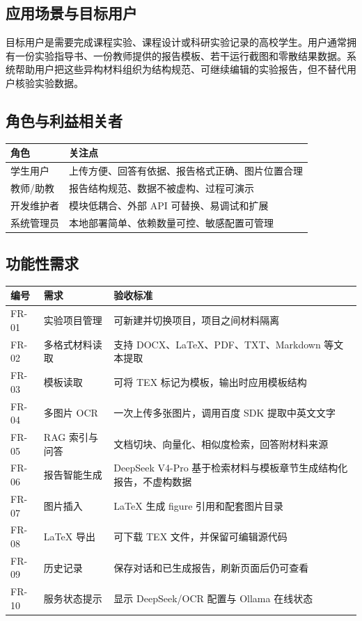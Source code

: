 \documentclass[12pt,a4paper]{ctexart}
\begin{document}
\subsection{应用场景与目标用户}
目标用户是需要完成课程实验、课程设计或科研实验记录的高校学生。用户通常拥有一份实验指导书、一份教师提供的报告模板、若干运行截图和零散结果数据。系统帮助用户把这些异构材料组织为结构规范、可继续编辑的实验报告，但不替代用户核验实验数据。

\subsection{角色与利益相关者}
\begin{table}[H]
\centering\small
\begin{tabularx}{\textwidth}{|X|X|}
\hline
\textbf{角色} & \textbf{关注点} \\ \hline
学生用户 & 上传方便、回答有依据、报告格式正确、图片位置合理 \\ \hline
教师/助教 & 报告结构规范、数据不被虚构、过程可演示 \\ \hline
开发维护者 & 模块低耦合、外部 API 可替换、易调试和扩展 \\ \hline
系统管理员 & 本地部署简单、依赖数量可控、敏感配置可管理 \\ \hline
\end{tabularx}
\end{table}
\subsection{功能性需求}
\begin{table}[H]
\centering\small
\begin{tabularx}{\textwidth}{|X|X|X|}
\hline
\textbf{编号} & \textbf{需求} & \textbf{验收标准} \\ \hline
FR-01 & 实验项目管理 & 可新建并切换项目，项目之间材料隔离 \\ \hline
FR-02 & 多格式材料读取 & 支持 DOCX、LaTeX、PDF、TXT、Markdown 等文本提取 \\ \hline
FR-03 & 模板读取 & 可将 TEX 标记为模板，输出时应用模板结构 \\ \hline
FR-04 & 多图片 OCR & 一次上传多张图片，调用百度 SDK 提取中英文文字 \\ \hline
FR-05 & RAG 索引与问答 & 文档切块、向量化、相似度检索，回答附材料来源 \\ \hline
FR-06 & 报告智能生成 & DeepSeek V4-Pro 基于检索材料与模板章节生成结构化报告，不虚构数据 \\ \hline
FR-07 & 图片插入 & LaTeX 生成 figure 引用和配套图片目录 \\ \hline
FR-08 & LaTeX 导出 & 可下载 TEX 文件，并保留可编辑源代码 \\ \hline
FR-09 & 历史记录 & 保存对话和已生成报告，刷新页面后仍可查看 \\ \hline
FR-10 & 服务状态提示 & 显示 DeepSeek/OCR 配置与 Ollama 在线状态 \\ \hline
\end{tabularx}
\end{table}
\end{document}
